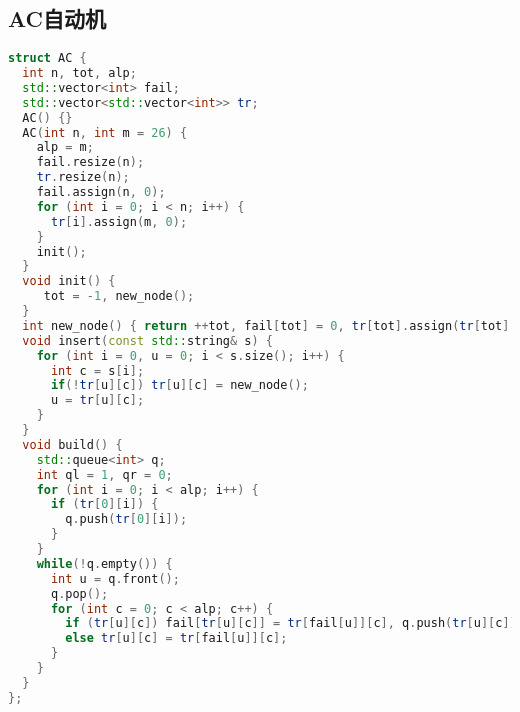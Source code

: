 \subsection{AC自动机}
\begin{lstlisting}[language=c++]
struct AC {
  int n, tot, alp;
  std::vector<int> fail;
  std::vector<std::vector<int>> tr;
  AC() {}
  AC(int n, int m = 26) {
    alp = m;
    fail.resize(n);
    tr.resize(n);
    fail.assign(n, 0);
    for (int i = 0; i < n; i++) {
      tr[i].assign(m, 0);
    }
    init();
  }
  void init() {
     tot = -1, new_node();
  }
  int new_node() { return ++tot, fail[tot] = 0, tr[tot].assign(tr[tot].size(), 0), tot; }
  void insert(const std::string& s) {
    for (int i = 0, u = 0; i < s.size(); i++) {
      int c = s[i];
      if(!tr[u][c]) tr[u][c] = new_node();
      u = tr[u][c];
    }
  }
  void build() {
    std::queue<int> q;
    int ql = 1, qr = 0;
    for (int i = 0; i < alp; i++) {
      if (tr[0][i]) {
        q.push(tr[0][i]);
      }
    }
    while(!q.empty()) {
      int u = q.front();
      q.pop(); 
      for (int c = 0; c < alp; c++) {
        if (tr[u][c]) fail[tr[u][c]] = tr[fail[u]][c], q.push(tr[u][c]);
        else tr[u][c] = tr[fail[u]][c];
      }
    }
  }
};
\end{lstlisting}